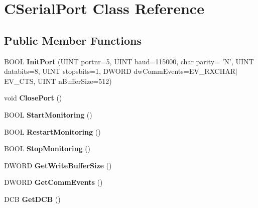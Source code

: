 \hypertarget{classCSerialPort}{
\section{CSerialPort Class Reference}
\label{classCSerialPort}
}
\subsection*{Public Member Functions}
\begin{DoxyCompactItemize}
\item 
\hypertarget{classCSerialPort_a42f4c47706372681484122ef5273366b}{
BOOL {\bfseries InitPort} (UINT portnr=5, UINT baud=115000, char parity= 'N', UINT databits=8, UINT stopsbits=1, DWORD dwCommEvents=EV\_\-RXCHAR$|$EV\_\-CTS, UINT nBufferSize=512)}
\label{classCSerialPort_a42f4c47706372681484122ef5273366b}

\item 
\hypertarget{classCSerialPort_ae0d2dd450a48c47a2039e9458290f04f}{
void {\bfseries ClosePort} ()}
\label{classCSerialPort_ae0d2dd450a48c47a2039e9458290f04f}

\item 
\hypertarget{classCSerialPort_a857bc7ba9e143cd114ffbb94cb05f59a}{
BOOL {\bfseries StartMonitoring} ()}
\label{classCSerialPort_a857bc7ba9e143cd114ffbb94cb05f59a}

\item 
\hypertarget{classCSerialPort_a29d8b3f2af87a93bbbd57e6a7ec9fe6a}{
BOOL {\bfseries RestartMonitoring} ()}
\label{classCSerialPort_a29d8b3f2af87a93bbbd57e6a7ec9fe6a}

\item 
\hypertarget{classCSerialPort_a442b9d838ee9c0fec8486a51fc9c23fc}{
BOOL {\bfseries StopMonitoring} ()}
\label{classCSerialPort_a442b9d838ee9c0fec8486a51fc9c23fc}

\item 
\hypertarget{classCSerialPort_a5e330d93575e5b012674cb567f1879af}{
DWORD {\bfseries GetWriteBufferSize} ()}
\label{classCSerialPort_a5e330d93575e5b012674cb567f1879af}

\item 
\hypertarget{classCSerialPort_ab4a7e6cafcd2fba87fc0a83bf4728388}{
DWORD {\bfseries GetCommEvents} ()}
\label{classCSerialPort_ab4a7e6cafcd2fba87fc0a83bf4728388}

\item 
\hypertarget{classCSerialPort_a428e130644f1d1cb2e1fa9608c3988e1}{
DCB {\bfseries GetDCB} ()}
\label{classCSerialPort_a428e130644f1d1cb2e1fa9608c3988e1}


\end{DoxyCompactItemize}

